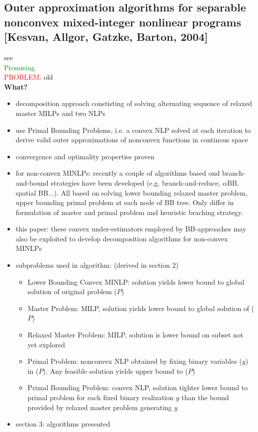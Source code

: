 \documentclass{article}
\begin{document}
\subsection{Outer approximation algorithms for separable nonconvex mixed-integer nonlinear programs [Kesvan, Allgor, Gatzke, Barton, 2004]}
see \cite{kesavan2004outer}\\
\textcolor{green}{Promising}\\
\textcolor{red}{PROBLEM:} old\\
\textbf{What?} 
\begin{itemize}
\item  decomposition approach constisting of solving alternating sequence of relaxed master MILPs and two NLPs
\item use Primal Bounding Problems, i.e. a convex NLP solved at each iteration to derive valid outer approximations of nonconvex functions in continous space
\item convergence and optimality properties proven
\item for non-convex MINLPs: recently a couple of algorithms based ond branch-and-bound strategies have been developed (e.g. branch-and-reduce, $\alpha$BB, spatial BB...). All based on solving lower bounding relaxed master problem, upper bounding primal problem at each node of BB tree. Only differ in formulation of master and primal problem and heuristic braching strategy.
\item this paper: these convex under-estimators employed by BB-approaches may also be exploited to develop decomposition algorithms for non-convex MINLPs
\item subproblems used in algorithm: (derived in section 2) 	
	\begin{itemize}
	\item Lower Bounding Convex MINLP: solution yields lower bound to global solution of original problem ($P$)
	\item Master Problem: MILP, solution yields lower bound to global solution of ($P$)
	\item Relaxed Master Problem: MILP, solution is lower bound on subset not yet explored
	\item Primal Problem: nonconvex NLP obtained by fixing binary variables ($y$) in ($P$). Any feasible solution yields upper bound to ($P$)
	\item Primal Bounding Problem: convex NLP, solution tighter lower bound to primal problem for each fixed binary realization $y$ than the bound provided by relaxed master problem generating $y$
	\end{itemize}
\item section 3: algorithms presented
\end{itemize}
\end{document}

